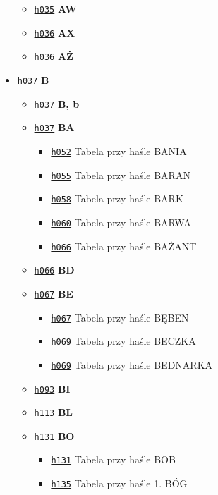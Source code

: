 \documentclass[12]{mwart}
\begin{document}
\begin{itemize}
\begin{itemize}
  \item \href{\pai{1}{167}}{\texttt{h035}} \textbf{AW}
  \item \href{\pai{1}{168}}{\texttt{h036}} \textbf{AX}
  \item \href{\pai{1}{168}}{\texttt{h036}} \textbf{AŻ}
  \end{itemize}
\item \href{\pai{1}{169}}{\texttt{h037}} \textbf{B}
     \begin{itemize}
     \item \href{\pai{1}{169}}{\texttt{h037}} \textbf{B, b}
     \item \href{\pai{1}{169}}{\texttt{h037}} \textbf{BA}
       \begin{itemize}
    \item \href{\pai{1}{184}}{\texttt{h052}} Tabela przy haśle BANIA
    \item \href{\pai{1}{187}}{\texttt{h055}} Tabela przy haśle BARAN
    \item \href{\pai{1}{190}}{\texttt{h058}} Tabela przy haśle BARK
    \item \href{\pai{1}{192}}{\texttt{h060}} Tabela przy haśle BARWA
    \item \href{\pai{1}{198}}{\texttt{h066}} Tabela przy haśle BAŻANT
       \end{itemize}
     \item \href{\pai{1}{198}}{\texttt{h066}} \textbf{BD}
     \item \href{\pai{1}{199}}{\texttt{h067}} \textbf{BE}
       \begin{itemize}
       \item \href{\pai{1}{199}}{\texttt{h067}} Tabela przy haśle BĘBEN
       \item \href{\pai{1}{201}}{\texttt{h069}} Tabela przy haśle BECZKA
       \item \href{\pai{1}{201}}{\texttt{h069}} Tabela przy haśle BEDNARKA
       \end{itemize}
     \item \href{\pai{1}{225}}{\texttt{h093}} \textbf{BI}
     \item \href{\pai{1}{245}}{\texttt{h113}} \textbf{BL}
     \item \href{\pai{1}{263}}{\texttt{h131}} \textbf{BO}
       \begin{itemize}
       \item \href{\pai{1}{263}}{\texttt{h131}} Tabela przy haśle BOB
       \item \href{\pai{1}{267}}{\texttt{h135}} Tabela przy haśle 1. BÓG

\end{itemize}
\end{itemize}
\end{itemize}
\end{document}
